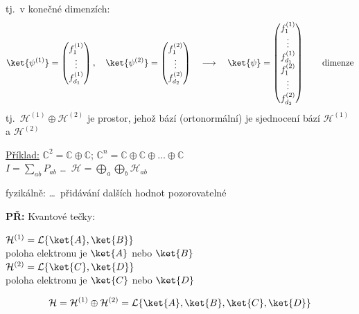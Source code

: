 \documentclass[11pt,a4paper]{article}
\begin{document}
tj.\ v konečné dimenzích:
\[
  \ket{\psi^{(1)}} = \begin{pmatrix} f_1^{(1)}\\ \vdots\\ f_{d_1}^{(1)}\end{pmatrix},\quad
  \ket{\psi^{(2)}} = \begin{pmatrix} f_1^{(2)}\\ \vdots\\ f_{d_2}^{(2)}\end{pmatrix}
  \quad\longrightarrow\quad
  \ket{\psi} = \begin{pmatrix} f_1^{(1)}\\ \vdots\\ f_{d_1}^{(1)}\\ f_1^{(2)}\\ \vdots\\ f_{d_2}^{(2)}\end{pmatrix}
  \qquad\text{dimenze}
\]
tj.\ $\mathcal{H}^{(1)}\oplus\mathcal{H}^{(2)}$ je prostor, jehož bází (ortonormální) je sjednocení bází $\mathcal{H}^{(1)}$ a $\mathcal{H}^{(2)}$

\underline{Příklad:} \quad $\mathbb{C}^2 = \mathbb{C}\oplus\mathbb{C}$; \quad $\mathbb{C}^n = \mathbb{C}\oplus\mathbb{C}\oplus\dots\oplus\mathbb{C}$ \\
 \quad $I = \sum_{ab}P_{ab}$ \quad \dots\ $\mathcal{H} = \bigoplus_a\bigoplus_b\mathcal{H}_{ab}$

fyzikálně: \dots\ přidávání dalších hodnot pozorovatelné

\begin{minipage}{0.4\textwidth}
\textbf{PŘ:} Kvantové tečky:

\begin{center}
\end{center}
\end{minipage}
\begin{minipage}{0.58\textwidth}
$\mathcal{H}^{(1)} = \mathcal{L}\{\ket{A},\ket{B}\}$ \\
\quad poloha elektronu je $\ket{A}$ nebo $\ket{B}$ \\
$\mathcal{H}^{(2)} = \mathcal{L}\{\ket{C},\ket{D}\}$ \\
\quad poloha elektronu je $\ket{C}$ nebo $\ket{D}$
\end{minipage}
\[
  \mathcal{H} = \mathcal{H}^{(1)}\oplus\mathcal{H}^{(2)} = \mathcal{L}\{\ket{A},\ket{B},\ket{C},\ket{D}\}
\]
\end{document}
